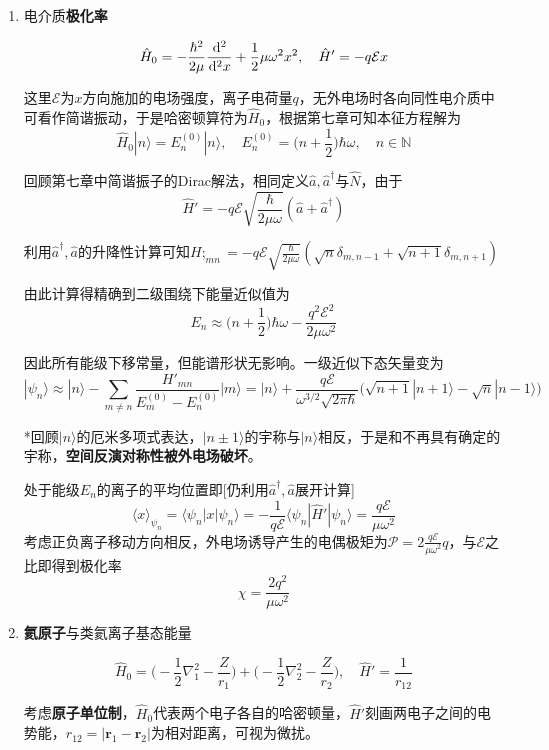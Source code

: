 \documentclass[a4paper,UTF8,fontset=windows]{ctexart}
\newcommand*{\dr}{\hspace{0.07em}\mathrm{d}}
\newcommand*{\ket}[1]{|#1\rangle}
\newcommand*{\blk}[3]{\langle#1|#2|#3\rangle}
\newcommand*{\br}{\mathbf{r}}
\begin{document}
\begin{enumerate}
    \item 电介质\textbf{极化率}
    
    $$\hat{H}_0=-\frac{\hbar^2}{2\mu}\frac{\dr^2}{\dr^2x}+\frac{1}{2}\mu\omega^2x^2,\quad\hat{H}'=-q\mathcal{E}x$$

    这里$\mathcal{E}$为$x$方向施加的电场强度，离子电荷量$q$，无外电场时各向同性电介质中可看作简谐振动，于是哈密顿算符为$\hat{H}_0$，根据第七章可知本征方程解为
    $$\hat{H}_0\ket{n}=E_n^{(0)}\ket{n},\quad E_n^{(0)}=\bigg(n+\frac{1}{2}\bigg)\hbar\omega,\quad n\in\mathbb{N}$$

    回顾第七章中简谐振子的Dirac解法，相同定义$\hat{a},\hat{a}^\dagger$与$\hat{N}$，由于
    $$\hat{H}'=-q\mathcal{E}\sqrt{\frac{\hbar}{2\mu\omega}}(\hat{a}+\hat{a}^\dagger)$$

    利用$\hat{a}^\dagger,\hat{a}$的升降性计算可知$H;_{mn}=-q\mathcal{E}\sqrt{\frac{\hbar}{2\mu\omega}}(\sqrt{n}\delta_{m,n-1}+\sqrt{n+1}\delta_{m,n+1})$

    由此计算得精确到二级围绕下能量近似值为
    $$E_n\approx\bigg(n+\frac{1}{2}\bigg)\hbar\omega-\frac{q^2\mathcal{E}^2}{2\mu\omega^2}$$
    
    因此所有能级下移常量，但能谱形状无影响。一级近似下态矢量变为
    $$\ket{\psi_n}\approx\ket{n}-\sum_{m\ne n}\frac{H'_{mn}}{E_m^{(0)}-E_n^{(0)}}\ket{m}=\ket{n}+\frac{q\mathcal{E}}{\omega^{3/2}\sqrt{2\pi\hbar}}\big(\sqrt{n+1}\ket{n+1}-\sqrt{n}\ket{n-1}\big)$$

    *回顾$\ket{n}$的厄米多项式表达，$\ket{n\pm1}$的宇称与$\ket{n}$相反，于是和不再具有确定的宇称，\textbf{空间反演对称性被外电场破坏}。

    处于能级$E_n$的离子的平均位置即[仍利用$\hat{a}^\dagger,\hat{a}$展开计算]
    $$\langle x\rangle_{\psi_n}=\blk{\psi_n}{x}{\psi_n}=-\frac{1}{q\mathcal{E}}\blk{\psi_n}{\hat{H}'}{\psi_n}=\frac{q\mathcal{E}}{\mu\omega^2}$$
    考虑正负离子移动方向相反，外电场诱导产生的电偶极矩为$\mathcal{P}=2\frac{q\mathcal{E}}{\mu\omega^2}q$，与$\mathcal{E}$之比即得到极化率
    $$\chi=\frac{2q^2}{\mu\omega^2}$$

    \item \textbf{氦原子}与类氦离子基态能量
    
    $$\hat{H}_0=\bigg(-\frac{1}{2}\nabla_1^2-\frac{Z}{r_1}\bigg)+\bigg(-\frac{1}{2}\nabla_2^2-\frac{Z}{r_2}\bigg),\quad\hat{H}'=\frac{1}{r_{12}}$$

    考虑\textbf{原子单位制}，$\hat{H}_0$代表两个电子各自的哈密顿量，$\hat{H}'$刻画两电子之间的电势能，$r_{12}=|\br_1-\br_2|$为相对距离，可视为微扰。


\end{enumerate}
\end{document}
